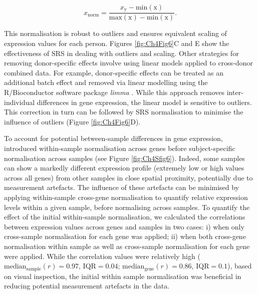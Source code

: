 \begin{equation}
    \label{eqn:eq3}
    x_\mathrm{norm} = \frac{x_\mathrm{y}-\mathrm{min(x)}}{\mathrm{max(x)}-\mathrm{min(x)}}.
\end{equation}

This normalisation is robust to outliers and ensures equivalent scaling of expression values for each person. Figures \ref{fig:Ch4Fig6}C and E show the effectiveness of SRS in dealing with outliers and scaling. Other strategies for removing donor-specific effects involve using linear models applied to cross-donor combined data. For example, donor-specific effects can be treated as an additional batch effect and removed via linear modelling using the R/Bioconductor software package \textit{limma} \mbox{\citep{Ritchie2015}}. While this approach removes inter-individual differences in gene expression, the linear model is sensitive to outliers. This correction in turn can be followed by SRS normalisation to minimise the influence of outliers (Figure \ref{fig:Ch4Fig6}D).

To account for potential between-sample differences in gene expression, \citet{Burt2018} introduced within-sample normalisation across genes before subject-specific normalisation across samples (see Figure \ref{fig:Ch4Sfig6}). Indeed, some samples can show a markedly different expression profile (extremely low or high values across all genes) from other samples in close spatial proximity, potentially due to measurement artefacts. The influence of these artefacts can be minimised by applying within-sample cross-gene normalisation to quantify relative expression levels within a given sample, before normalising across samples. To quantify the effect of the initial within-sample normalisation, we calculated the correlations between expression values across genes and samples in two cases: i) when only cross-sample normalisation for each gene was applied; ii) when both cross-gene normalisation within sample as well as cross-sample normalisation for each gene were applied. While the correlation values were relatively high ($\mathrm{median_\mathrm{sample}}(r) =  0.97$, $\mathrm{IQR} = 0.04$; $\mathrm{median_\mathrm{gene}}(r) = 0.86$, $\mathrm{IQR} = 0.1$), based on visual inspection, the initial within sample normalisation was beneficial in reducing potential measurement artefacts in the data.

